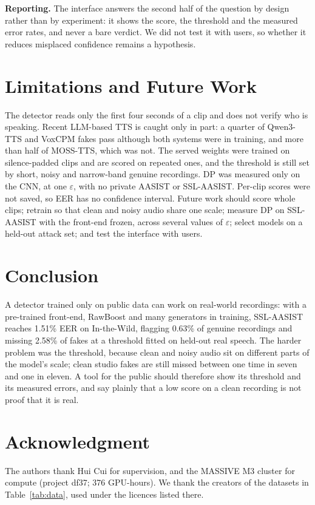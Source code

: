 \documentclass[journal]{IEEEtran}
\begin{document}
\textbf{Reporting.} The interface answers the second half of the question by
design rather than by experiment: it shows the score, the threshold and the
measured error rates, and never a bare verdict. We did not test it with
users, so whether it reduces misplaced confidence remains a hypothesis.

\section{Limitations and Future Work}
The detector reads only the first four seconds of a clip and does not verify
who is speaking. Recent LLM-based TTS is caught only in part: a quarter of
Qwen3-TTS and VoxCPM fakes pass although both systems were in training, and
more than half of MOSS-TTS, which was not. The served weights were trained on
silence-padded clips and are scored on repeated ones, and the threshold is
still set by short, noisy and narrow-band genuine recordings. DP was measured
only on the CNN, at one $\varepsilon$, with no private
AASIST or SSL-AASIST. Per-clip scores were not saved, so EER has no confidence
interval. Future work should score whole clips; retrain so that clean and
noisy audio share one scale; measure DP on SSL-AASIST with the front-end
frozen, across several values of $\varepsilon$; select models on a held-out
attack set; and test the interface with users.

\section{Conclusion}
A detector trained only on public data can work on real-world recordings: with
a pre-trained front-end, RawBoost and many generators in training, SSL-AASIST
reaches 1.51\% EER on In-the-Wild, flagging 0.63\% of genuine recordings and
missing 2.58\% of fakes at a threshold fitted on held-out real speech. The
harder problem was the threshold, because clean and noisy audio sit on
different parts of the model's scale; clean studio fakes are still missed
between one time in seven and one in eleven. A tool for the public should
therefore show its threshold and its measured errors, and say plainly that a
low score on a clean recording is not proof that it is real.

\section*{Acknowledgment}
The authors thank Hui Cui for supervision, and the MASSIVE M3
cluster for compute (project df37; 376 GPU-hours). We thank the creators of
the datasets in Table~\ref{tab:data}, used under the licences listed there.
\end{document}
